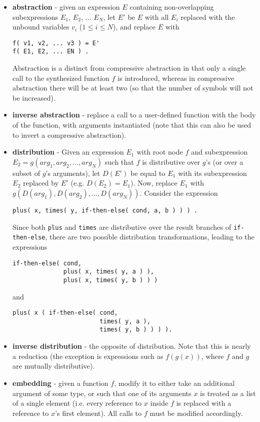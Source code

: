\documentclass[letterpaper]{article}
\begin{document}
\begin{itemize}
\item \textbf{abstraction} - given an expression $E$ containing non-overlapping
  subexpressions $E_1$, $E_2$, ... $E_N$, let $E'$ be $E$ with all $E_i$
  replaced with the unbound variables $v_i$ ($1 \le i \le N$), and replace $E$
  with
\begin{verbatim}
f( v1, v2, ... v3 ) = E'
f( E1, E2, ... EN ) .
\end{verbatim}
  Abstraction is a distinct from compressive abstraction in that only a single
  call to the synthesized function $f$ is introduced, whereas in
  compressive abstraction there will be at least two (so that the number
  of symbols will not be increased).
\item \textbf{inverse abstraction} - replace a call to a user-defined
  function with the body of the function, with arguments instantiated (note
  that this can also be used to invert a compressive abstraction).
\item \textbf{distribution} - Given an expression $E_1$ with root node $f$ and
  subexpression $E_2 = g(arg_1,arg_2,...,arg_N)$ such that $f$ is distributive
  over $g$'s (or over a subset of $g$'s arguments), let $D(E')$ be
  equal to $E_1$ with its subexpression $E_2$ replaced by $E'$ (e.g. $D(E_2) =
  E_1$). Now, replace $E_1$ with $g(D(arg_1),D(arg_2),...,D(arg_N))$. Consider
  the expression
\begin{verbatim}
plus( x, times( y, if-then-else( cond, a, b ) ) ) .
\end{verbatim}
  Since both \verb|plus| and \verb|times| are distributive over the result
  branches of \verb|if-then-else|, there are two possible distribution
  transformations, leading to the expressions
\begin{verbatim}
if-then-else( cond, 
              plus( x, times( y, a ) ), 
              plus( x, times( y, b ) ) )
\end{verbatim}
and
\begin{verbatim}
plus( x ( if-then-else( cond, 
                        times( y, a ),
                        times( y, b ) ) ) ).
\end{verbatim}
\item \textbf{inverse distribution} - the opposite of distribution. Note that
  this is nearly a reduction (the exception is expressions such as $f(g(x))$,
  where $f$ and $g$ are mutually distributive).
\item \textbf{embedding} - given a function $f$, modify it to either take an
  additional argument of some type, or such that one of its arguments $x$ is
  treated as a list of a single element (i.e. every reference to $x$ inside $f$
  is replaced with a reference to $x$'s first element). All calls to $f$ must
  be modified accordingly.
\end{itemize}
\end{document}
